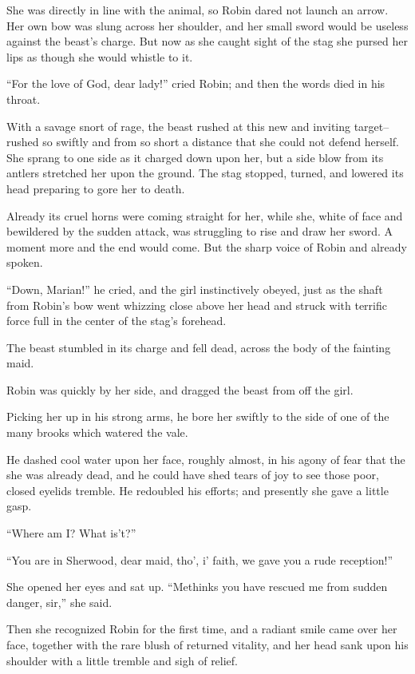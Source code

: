 She was directly in line with the animal, so Robin dared not launch an
arrow. Her own bow was slung across her shoulder, and her small sword
would be useless against the beast's charge. But now as she caught sight
of the stag she pursed her lips as though she would whistle to it.

``For the love of God, dear lady!'' cried Robin; and then the words died
in his throat.

With a savage snort of rage, the beast rushed at this new and inviting
target--rushed so swiftly and from so short a distance that she could
not defend herself. She sprang to one side as it charged down upon her,
but a side blow from its antlers stretched her upon the ground. The stag
stopped, turned, and lowered its head preparing to gore her to death.

Already its cruel horns were coming straight for her, while she, white
of face and bewildered by the sudden attack, was struggling to rise and
draw her sword. A moment more and the end would come. But the sharp
voice of Robin and already spoken.

``Down, Marian!'' he cried, and the girl instinctively obeyed, just as
the shaft from Robin's bow went whizzing close above her head and struck
with terrific force full in the center of the stag's forehead.

The beast stumbled in its charge and fell dead, across the body of the
fainting maid.

Robin was quickly by her side, and dragged the beast from off the girl.

Picking her up in his strong arms, he bore her swiftly to the side of
one of the many brooks which watered the vale.

He dashed cool water upon her face, roughly almost, in his agony of fear
that the she was already dead, and he could have shed tears of joy to
see those poor, closed eyelids tremble. He redoubled his efforts; and
presently she gave a little gasp.

``Where am I? What is't?''

``You are in Sherwood, dear maid, tho', i' faith, we gave you a rude
reception!''

She opened her eyes and sat up. ``Methinks you have rescued me from
sudden danger, sir,'' she said.

Then she recognized Robin for the first time, and a radiant smile came
over her face, together with the rare blush of returned vitality, and
her head sank upon his shoulder with a little tremble and sigh of
relief.

